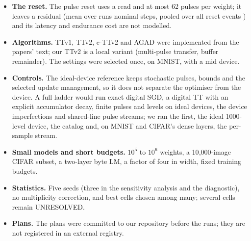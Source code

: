 \begin{itemize}
\item \textbf{The reset.} The pulse reset uses a read and at most 62 pulses per weight; it leaves a residual (mean over runs
      \RVResetResidMean{} nominal steps, pooled over all reset events \RVResetResidPooled) and its latency and endurance cost are not modelled.
\item \textbf{Algorithms.} TTv1, TTv2, c-TTv2 and AGAD were implemented from the papers' text; our TTv2 is a local variant
      (multi-pulse transfer, buffer remainder). The settings were selected once, on MNIST, with a mid device.
\item \textbf{Controls.} The ideal-device reference keeps stochastic pulses, bounds and the selected update management, so it
      does not separate the optimiser from the device. A full ladder would run exact digital SGD, a digital TT with an
      explicit accumulator decay, finite pulses and levels on ideal devices, the device imperfections and shared-line pulse
      streams; we ran the first, the ideal 1000-level device, the catalog and, on MNIST and CIFAR's dense layers, the
      per-sample stream.
\item \textbf{Small models and short budgets.} $10^5$ to $10^6$ weights, a 10{,}000-image CIFAR subset, a two-layer byte LM,
      a factor of four in width, fixed training budgets.
\item \textbf{Statistics.} Five seeds (three in the sensitivity analysis and the diagnostic), no multiplicity correction, and best
      cells chosen among many; several cells remain UNRESOLVED.
\item \textbf{Plans.} The plans were committed to our repository before the runs; they are not registered in an external
      registry.
\end{itemize}
